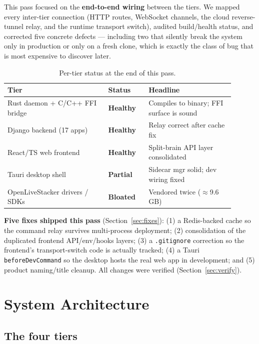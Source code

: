 \documentclass[11pt]{article}
\newcommand{\sevm}[1]{\textbf{\textcolor{acamber}{#1}}}
\newcommand{\ok}[1]{\textbf{\textcolor{acgreen}{#1}}}
\begin{document}
This pass focused on the \textbf{end-to-end wiring} between the tiers. We mapped every
inter-tier connection (HTTP routes, WebSocket channels, the cloud reverse-tunnel relay, and the
runtime transport switch), audited build/health status, and corrected five concrete defects ---
including two that silently break the system only in production or only on a fresh clone, which is
exactly the class of bug that is most expensive to discover later.

\begin{table}[h]
\centering
\renewcommand{\arraystretch}{1.3}
\begin{tabular}{>{\raggedright\arraybackslash}p{0.40\linewidth} >{\raggedright\arraybackslash}p{0.16\linewidth} >{\raggedright\arraybackslash}p{0.34\linewidth}}
\toprule
\textbf{Tier} & \textbf{Status} & \textbf{Headline} \\
\midrule
Rust daemon + C/C++ FFI bridge & \ok{Healthy} & Compiles to binary; FFI surface is sound \\
Django backend (17 apps) & \ok{Healthy} & Relay correct after cache fix \\
React/TS web frontend & \ok{Healthy} & Split-brain API layer consolidated \\
Tauri desktop shell & \sevm{Partial} & Sidecar mgr solid; dev wiring fixed \\
OpenLiveStacker drivers / SDKs & \sevm{Bloated} & Vendored twice ($\approx$9.6\,GB) \\
\bottomrule
\end{tabular}
\caption{Per-tier status at the end of this pass.}
\end{table}

\noindent\textbf{Five fixes shipped this pass} (Section~\ref{sec:fixes}): (1) a Redis-backed cache so the
command relay survives multi-process deployment; (2) consolidation of the duplicated frontend API/env/hooks
layers; (3) a \texttt{.gitignore} correction so the frontend's transport-switch code is actually tracked;
(4) a Tauri \texttt{beforeDevCommand} so the desktop hosts the real web app in development; and (5) product
naming/title cleanup. All changes were verified (Section~\ref{sec:verify}).

\section{System Architecture}

\subsection{The four tiers}
\end{document}
